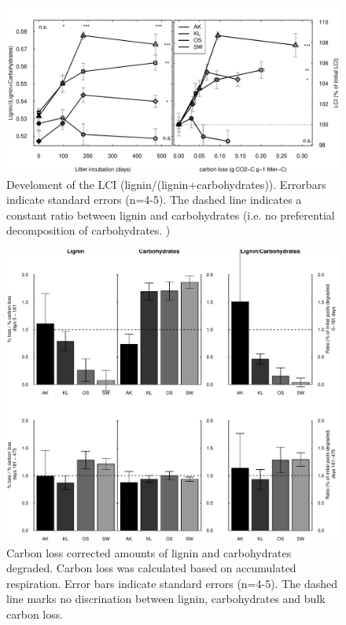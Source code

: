\documentclass[authoryear,preprint,review,12pt]{elsarticle}
\begin{document}
\newpage
\begin{figure}[h!]
\vspace*{2mm}
\begin{center}
\includegraphics{sbb-lci}
\end{center}
\caption{Develoment of the LCI (lignin/(lignin+carbohydrates)). Errorbars indicate standard errors (n=4-5). The dashed line indicates a constant ratio between lignin and carbohydrates (i.e. no preferential decomposition of carbohydrates. )}
\label{fig:lci}
\end{figure}

\newpage
\begin{figure}[h!]
\vspace*{2mm}
\begin{center}
\includegraphics{sbb-degrdiff}
\end{center}
\caption{Carbon loss corrected amounts of lignin and carbohydrates degraded. Carbon loss was calculated based on accumulated respiration. Error bars indicate standard errors (n=4-5). The dashed line marks no discrination between lignin, carbohydrates and bulk carbon loss.}
\label{fig:degr}
\end{figure}
\end{document}
